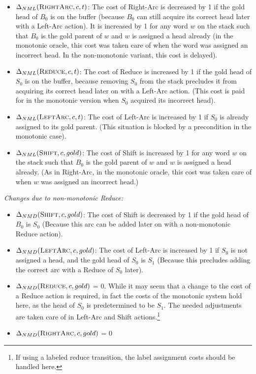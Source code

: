 \documentclass[11pt,letterpaper]{article}
\begin{document}
\begin{itemize}
   \item $\Delta_{NML}(\textsc{RightArc},c,t)$: The cost of Right-Arc is
      decreased by 1 if the gold head of $B_0$ is on the buffer
         (because $B_0$ can still acquire its correct head later with a Left-Arc action).
It is increased by 1 for any word $w$ on the stack such that $B_0$ is the gold
parent of $w$ and $w$ is assigned a head already (in the monotonic oracle,
this cost was taken care of when the word was assigned an incorrect head. In the
non-monotonic variant, this cost is delayed).

   \item $\Delta_{NML}(\textsc{Reduce},c,t)$: The cost of Reduce is increased
      by 1 if the gold head of $S_0$ is on the buffer,
because removing $S_0$ from the stack precludes it from acquiring its correct head later on with
a Left-Arc action. (This cost is paid for in the monotonic version when $S_0$
acquired its incorrect head).

   \item $\Delta_{NML}(\textsc{LeftArc},c,t)$: The cost of Left-Arc is increased by 1 if $S_0$ is already assigned to its gold
parent. (This situation is blocked by a precondition in the monotonic
case).

  \item $\Delta_{NML}(\textsc{Shift},c,gold)$: The cost of Shift is increased
     by 1 for any word $w$ on the stack such that $B_0$ is the gold
parent of $w$ and $w$ is assigned a head already. (As in Right-Arc, in the monotonic oracle,
this cost was taken care of when $w$ was assigned an incorrect head.)
\end{itemize}

\noindent \emph{Changes due to non-monotonic Reduce:}
\begin{itemize}

   \item $\Delta_{NMD}(\textsc{Shift},c,gold)$: The cost of Shift is decreased
      by 1 if the gold head of $B_0$ is $S_0$ (Because this arc can be added
      later on with a non-monotonic Reduce action).

   \item $\Delta_{NMD}(\textsc{LeftArc},c,gold)$: The cost of Left-Arc is
      increased by 1 if $S_0$ is not assigned a head, and the gold head of
      $S_0$ is $S_{1}$ (Because this precludes adding the correct arc
      with a Reduce of $S_0$ later).

   \item $\Delta_{NMD}(\textsc{Reduce},c,gold)$ = 0. While it may seem that a
      change to the cost of a Reduce action is required, in fact the costs of
      the monotonic system hold here, as the head of $S_0$ is predetermined to
      be $S_1$.  The needed adjustments are taken care of
      in Left-Arc and Shift actions.\footnote{If using a labeled reduce transition,
      the label assignment costs should be handled here.}

   \item $\Delta_{NMD}(\textsc{RightArc},c,gold)$ = 0
\end{itemize}
\end{document}
